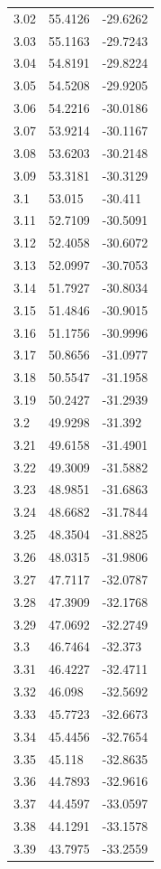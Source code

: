 \begin{table}
\begin{tabular}{lll}
3.02 & 55.4126 & -29.6262 \\
3.03 & 55.1163 & -29.7243 \\
3.04 & 54.8191 & -29.8224 \\
3.05 & 54.5208 & -29.9205 \\
3.06 & 54.2216 & -30.0186 \\
3.07 & 53.9214 & -30.1167 \\
3.08 & 53.6203 & -30.2148 \\
3.09 & 53.3181 & -30.3129 \\
3.1 & 53.015 & -30.411 \\
3.11 & 52.7109 & -30.5091 \\
3.12 & 52.4058 & -30.6072 \\
3.13 & 52.0997 & -30.7053 \\
3.14 & 51.7927 & -30.8034 \\
3.15 & 51.4846 & -30.9015 \\
3.16 & 51.1756 & -30.9996 \\
3.17 & 50.8656 & -31.0977 \\
3.18 & 50.5547 & -31.1958 \\
3.19 & 50.2427 & -31.2939 \\
3.2 & 49.9298 & -31.392 \\
3.21 & 49.6158 & -31.4901 \\
3.22 & 49.3009 & -31.5882 \\
3.23 & 48.9851 & -31.6863 \\
3.24 & 48.6682 & -31.7844 \\
3.25 & 48.3504 & -31.8825 \\
3.26 & 48.0315 & -31.9806 \\
3.27 & 47.7117 & -32.0787 \\
3.28 & 47.3909 & -32.1768 \\
3.29 & 47.0692 & -32.2749 \\
3.3 & 46.7464 & -32.373 \\
3.31 & 46.4227 & -32.4711 \\
3.32 & 46.098 & -32.5692 \\
3.33 & 45.7723 & -32.6673 \\
3.34 & 45.4456 & -32.7654 \\
3.35 & 45.118 & -32.8635 \\
3.36 & 44.7893 & -32.9616 \\
3.37 & 44.4597 & -33.0597 \\
3.38 & 44.1291 & -33.1578 \\
3.39 & 43.7975 & -33.2559 \\

\end{tabular}
\end{table}
